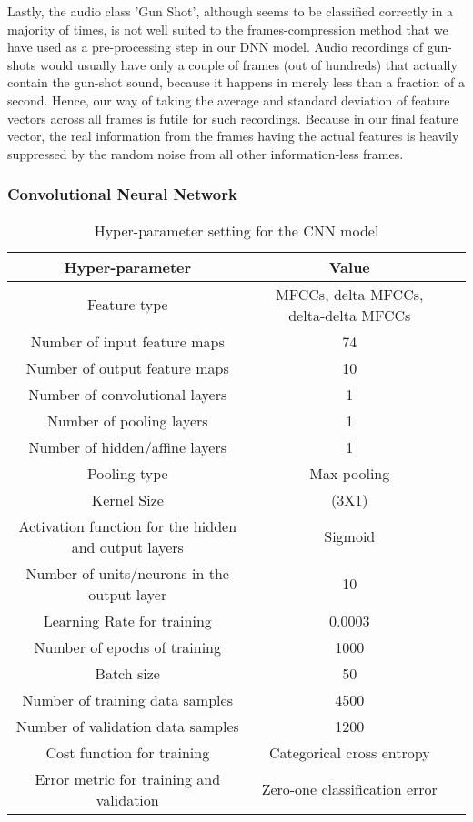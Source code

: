 Lastly, the audio class 'Gun Shot', although seems to be classified correctly in a majority of times, is not well suited to the frames-compression method that we have used as a pre-processing step in our DNN model. Audio recordings of gun-shots would usually have only a couple of frames (out of hundreds) that actually contain the gun-shot sound, because it happens in merely less than a fraction of a second. Hence, our way of taking the average and standard deviation of feature vectors across all frames is futile for such recordings. Because in our final feature vector, the real information from the frames having the actual features is heavily suppressed by the random noise from all other information-less frames.

\subsubsection{Convolutional Neural Network}

\begin{table}[tb]
\caption[CNN Hyperparamters DB1]{Hyper-parameter setting for the CNN model}
\label{tab:cnn_hyper_db1}
\centering
\begin{tabular}{ccc}
\toprule
Hyper-parameter & Value \\ 
\midrule
Feature type	& MFCCs, delta MFCCs, delta-delta MFCCs \\
Number of input feature maps	& 74 \\
Number of output feature maps	& 10 \\
Number of convolutional layers	& 1 \\
Number of pooling layers	& 1 \\
Number of hidden/affine layers	& 1 \\
Pooling type	& Max-pooling \\
Kernel Size	& (3X1) \\
Activation function for the hidden and output layers & Sigmoid\\
Number of units/neurons in the output layer	& 10 \\
Learning Rate for training	& 0.0003 \\
Number of epochs of training	& 1000 \\
Batch size	& 50 \\
Number of training data samples	& 4500 \\
Number of validation data samples & 1200 \\
Cost function for training	& Categorical cross entropy \\
Error metric for training and validation	& Zero-one classification error\\
\bottomrule 
\end{tabular}
\end{table}

